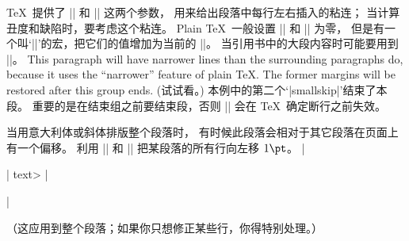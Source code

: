 \danger  \TeX\ 提供了 |\leftskip| 和 |\rightskip| 这两个参数，
用来给出段落中每行左右插入的粘连；
当计算丑度和缺陷时，要考虑这个粘连。%
Plain \TeX\ 一般设置 |\leftskip| 和 |\rightskip| 为零，
但是有一个叫`|\narrower|'的宏，把它们的值增加为当前的 |\parindent|。%
当引用书中的大段内容时可能要用到 |\narrower|。
\begintt
{\narrower\smallskip\noindent
This paragraph will have narrower lines than
the surrounding paragraphs do, because it
uses the ``narrower'' feature of plain \TeX.
The former margins will be restored after
this group ends.\smallskip}
\endtt
(试试看。)
本例中的第二个`|smallskip|'结束了本段。%
重要的是在结束组之前要结束段，否则 |\narrower| 会在 \TeX\ 确定断行之前失效。

\dangerexercise 当用意大利体或斜体排版整个段落时，
有时候此段落会相对于其它段落在页面上有一个偏移。%
利用 |\leftskip| 和 |\rightskip| 把某段落的所有行向左移 $1\pt$。
\answer |{\leftskip=-1pt \rightskip=1pt| \<text> |\par}|\par
\nobreak\medskip\noindent
（这应用到整个段落；如果你只想修正某些行，你得特别处理。）

